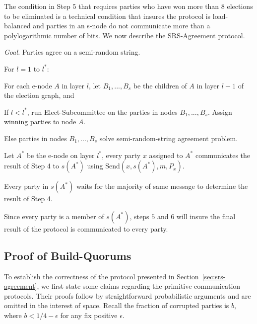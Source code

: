 \documentclass[11pt,letter]{article}
\theoremstyle{mytheoremstyle}
\let\savedCaption=\caption
\renewcommand*{\caption}[1]{\savedCaption[#1]{~#1}}
\newcommand{\algfont}{}
\newcommand{\Send}{\textsf{Send}}
\newenvironment{indentpar}[1]{\begin{list}{}{\setlength{\leftmargin}{#1}}\item[]}
{\end{list}}
\newcommand{\rs}{semi-random-string agreement\xspace}
\newcommand{\es}{\mbox{\textsf{Elect-Subcommittee}}\xspace}
\newcommand{\rsAlg}{\mbox{\textsf{SRS-Agreement}}\xspace}
\begin{document}
The condition in Step $5$ that requires parties who have won more than $8$ elections to be eliminated is a technical condition that insures the protocol is load-balanced and parties in an \textsf{s-node} do not communicate more than a polylogarithmic number of bits. We now describe the \rsAlg protocol.
\begin{algorithm}
	\caption{{\sf Scalable-}\rsAlg}
		\medskip
		\algfont
		\textit{Goal.} Parties agree on a semi-random string.
	\begin{enumerate}
		\item For $l = 1$ to $l^*$:
		\item
		\begin{indentpar}{0.3cm}
			For each \textsf{e-node} $A$ in layer $l$, let $B_1, . . . ,B_s$ be the children of $A$ in layer $l-1$ of the election graph, and
		\end{indentpar}
		\item
		\begin{indentpar}{0.6cm}
			If $l < l^*$, run \es on the parties in nodes $B_1, . . . ,B_s$. Assign winning parties to node $A$.
		\end{indentpar}
		\item
		\begin{indentpar}{0.6cm}
			Else parties in nodes $B_1, . . . ,B_s$ solve \rs problem.
		\end{indentpar}
		\item Let $A^*$ be the \textsf{e-node} on layer $l^*$, every party $x$ assigned to $A^*$ communicates the result of Step 4 to $s(A^*)$ using \Send$(x, s(A^*), m, P_x)$.
		\item Every party in $s(A^*)$ waits for the majority of same message to determine the result of Step 4.
	\end{enumerate}
\end{algorithm}

Since every party is a member of $s(A^{*})$, steps $5$ and $6$ will insure the final result of the protocol is communicated to every party.

\subsection{Proof of \textsf{Build-Quorums}} \label{sec:cq-proofs}
To establish the correctness of the protocol presented in Section~\ref{sec:srs-agreement}, we first state some claims regarding the primitive communication protocols. Their proofs follow by straightforward probabilistic arguments and are omitted in the interest of space. Recall the fraction of corrupted parties is $b$, where $b < 1/4 - \epsilon$ for any fix positive $\epsilon$.
\end{document}
